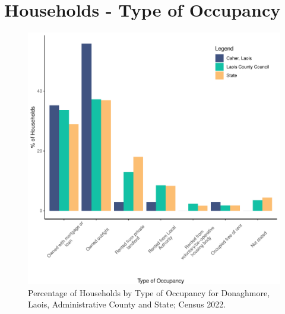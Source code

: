 \documentclass{article}
\begin{document}
\section{Households - Type of Occupancy}\label{sect:Households}
\begin{figure}[H]
	\centering
	\includegraphics[width = 140mm]{../figures/HouseholdsED.pdf}
	\caption{Percentage of Households by Type of Occupancy for Donaghmore, Laois, Administrative County and State; Census 2022.}
	\label{fig:vbnv}
	\end{figure}
\end{document}
